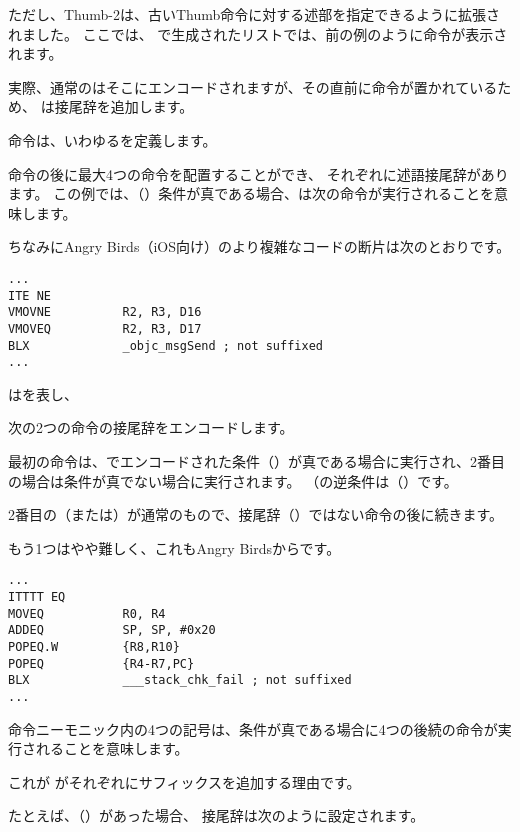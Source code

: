 
ただし、Thumb-2は、古いThumb命令に対する述部を指定できるように拡張されました。
ここでは、 \IDA で生成されたリストでは、前の例のように命令が表示されます。

実際、通常のはそこにエンコードされますが、その直前に命令が置かれているため、
\IDA は接尾辞を追加します。

\label{ARM_Thumb_IT}
命令は、いわゆるを定義します。

命令の後に最大4つの命令を配置することができ、
それぞれに述語接尾辞があります。
この例では、（）条件が真である場合、は次の命令が実行されることを意味します。

ちなみにAngry Birds（iOS向け）のより複雑なコードの断片は次のとおりです。

\begin{lstlisting}[caption=Angry Birds Classic,style=customasmARM]
...
ITE NE
VMOVNE          R2, R3, D16
VMOVEQ          R2, R3, D17
BLX             _objc_msgSend ; not suffixed
...
\end{lstlisting}

はを表し、

次の2つの命令の接尾辞をエンコードします。

最初の命令は、でエンコードされた条件（）が真である場合に実行され、2番目の場合は条件が真でない場合に実行されます。
（の逆条件は（）です。

2番目の（または）が通常のもので、接尾辞（）ではない命令の後に続きます。

もう1つはやや難しく、これもAngry Birdsからです。

\begin{lstlisting}[caption=Angry Birds Classic,style=customasmARM]
...
ITTTT EQ
MOVEQ           R0, R4
ADDEQ           SP, SP, #0x20
POPEQ.W         {R8,R10}
POPEQ           {R4-R7,PC}
BLX             ___stack_chk_fail ; not suffixed
...
\end{lstlisting}

命令ニーモニック内の4つの記号は、条件が真である場合に4つの後続の命令が実行されることを意味します。

これが \IDA がそれぞれにサフィックスを追加する理由です。

たとえば、（）があった場合、
接尾辞は次のように設定されます。

